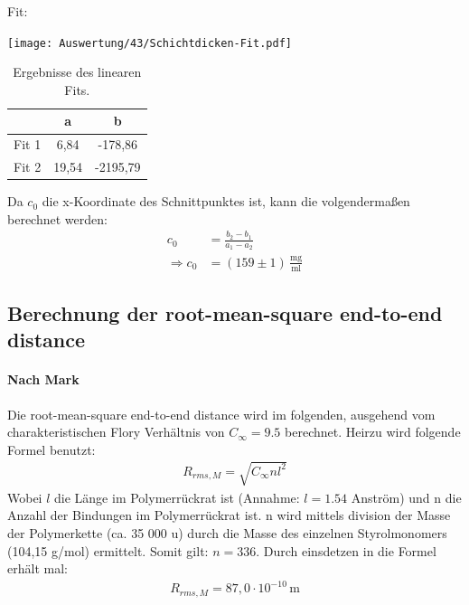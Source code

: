 Fit:
\begin{center}
	\captionsetup{type=figure}
	\texttt{[image: Auswertung/43/Schichtdicken-Fit.pdf]}
\end{center}

\begin{table}[h]
	\centering
	\begin{tabular}{r|c|c}
		& a & b \\ \hline
		Fit 1 & 6,84 & -178,86 \\
		Fit 2 & 19,54 & -2195,79
	\end{tabular}
	\caption[]{Ergebnisse des linearen Fits.}
\end{table}

Da $c_0$ die x-Koordinate des Schnittpunktes ist, kann die volgendermaßen berechnet werden:
\begin{align}
	c_0 &= \frac{b_2 - b_1}{a_1 - a_2}\\
	\Rightarrow c_0 &= (159 \pm 1) \, \frac{\text{mg}}{\text{ml}}
\end{align}

\subsection{Berechnung der root-mean-square end-to-end distance}

\paragraph*{Nach Mark}
Die root-mean-square end-to-end distance wird im folgenden, ausgehend vom charakteristischen Flory Verhältnis von $C_\infty = 9.5$ berechnet. Heirzu wird folgende Formel benutzt:
\begin{gather}
	R_{rms,M} = \sqrt{C_\infty n l^2}
\end{gather}
Wobei $l$ die Länge im Polymerrückrat ist (Annahme: $l = 1.54$ Anström) und n die Anzahl der Bindungen im Polymerrückrat ist. n wird mittels division der Masse der Polymerkette (ca. 35 000 u) durch die Masse des einzelnen Styrolmonomers (104,15 g/mol) ermittelt. Somit gilt: $ n = 336 $.
Durch einsdetzen in die Formel erhält mal:
\begin{gather}
	R_{rms,M} = 87,0 \cdot 10^{-10} \, \text{m}
\end{gather}

